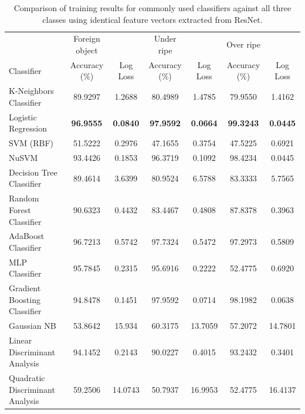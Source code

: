 \documentclass[fleqn,twoside]{article}
\begin{document}
\begin{table}
	\centering
	\caption{Comparison of training results for commonly used classifiers against all three classes using identical feature vectors extracted from ResNet.}
	\label{tab:classifiers}
	\begin{tabularx}{\textheight}{Xcccccc}
		\toprule
		& Foreign object &          & Under ripe    &          & Over ripe     &           \\  
		Classifier & Accuracy (\%)  & Log Loss & Accuracy (\%) & Log Loss & Accuracy (\%) & Log Loss  \\ 
		\midrule
		K-Neighbors Classifier          & 89.9297  & 1.2688 & 80.4989 & 1.4785 & 79.9550 & 1.4162 \\[6pt] 
		Logistic Regression	            & \textbf{96.9555}  & \textbf{0.0840} & \textbf{97.9592} & \textbf{0.0664} &  \textbf{99.3243} & \textbf{0.0445} \\[6pt]
		SVM (RBF)	                    & 51.5222  & 0.2976 & 47.1655 & 0.3754 & 47.5225 & 0.6921 \\[6pt]
		NuSVM	                        & 93.4426  & 0.1853 & 96.3719 & 0.1092 & 98.4234 & 0.0445 \\[6pt]
		Decision Tree Classifier	    & 89.4614  & 3.6399 & 80.9524 & 6.5788 & 83.3333 & 5.7565 \\[6pt]
		Random Forest Classifier	    & 90.6323  & 0.4432 & 83.4467 & 0.4808 & 87.8378 & 0.3963 \\[6pt]
		AdaBoost Classifier	            & 96.7213  & 0.5742 & 97.7324 & 0.5472 & 97.2973 & 0.5809 \\[6pt]
		MLP Classifier	                & 95.7845  & 0.2315 & 95.6916 & 0.2222 & 52.4775 & 0.6920 \\[6pt]
		Gradient Boosting Classifier	& 94.8478  & 0.1451 & 97.9592 & 0.0714 & 98.1982 & 0.0638 \\[6pt]
		Gaussian NB	                    & 53.8642  & 15.934 & 60.3175 & 13.7059 & 57.2072 & 14.7801 \\[6pt]
		Linear Discriminant Analysis	& 94.1452  & 0.2143 & 90.0227 & 0.4015 & 93.2432 & 0.3401 \\[6pt]
		Quadratic Discriminant Analysis	& 59.2506  & 14.0743 & 50.7937 & 16.9953 & 52.4775 & 16.4137 \\[6pt]
		\bottomrule 
	\end{tabularx}
\end{table}
\end{document}
